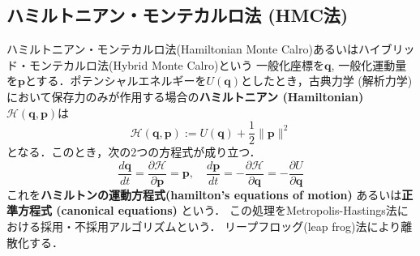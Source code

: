 \subsection{ハミルトニアン・モンテカルロ法 (HMC法)}ハミルトニアン・モンテカルロ法(Hamiltonian Monte Calro)あるいはハイブリッド・モンテカルロ法(Hybrid Monte Calro)という
一般化座標を$\mathbf{q}$, 一般化運動量を$\mathbf{p}$とする．ポテンシャルエネルギーを$U(\mathbf{q})$としたとき，古典力学 (解析力学) において保存力のみが作用する場合の\textbf{ハミルトニアン (Hamiltonian)} $\mathcal{H}(\mathbf{q}, \mathbf{p})$は
$$
\mathcal{H}(\mathbf{q}, \mathbf{p}):=U(\mathbf{q})+\frac{1}{2}\|\mathbf{p}\|^2
$$
となる．このとき，次の2つの方程式が成り立つ．
$$
\frac{d\mathbf{q}}{dt}=\frac{\partial \mathcal{H}}{\partial \mathbf{p}}=\mathbf{p},\quad\frac{d\mathbf{p}}{dt}=-\frac{\partial \mathcal{H}}{\partial \mathbf{q}}=-\frac{\partial U}{\partial \mathbf{q}}
$$
これを\textbf{ハミルトンの運動方程式(hamilton's equations of motion)} あるいは\textbf{正準方程式 (canonical equations)} という．
この処理をMetropolis-Hastings法における採用・不採用アルゴリズムという．
リープフロッグ(leap frog)法により離散化する．